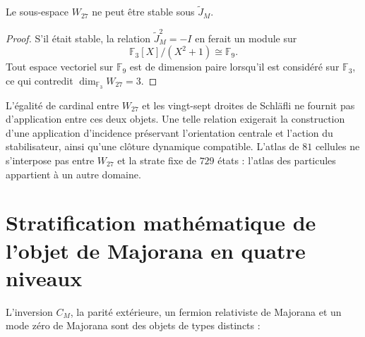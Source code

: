\begin{corollary}
\label{cor:obstruccion-cuadratica-w27} Le sous-espace \(W_{27}\) ne peut être stable sous \(\widetilde J_M\).
\end{corollary}

\begin{proof}
S’il était stable, la relation \(\widetilde J_M^2=-I\) en ferait un module sur
\[
 \mathbb F_3[X]/(X^2+1)\cong\mathbb F_9.
\]
Tout espace vectoriel sur \(\mathbb F_9\) est de dimension paire lorsqu’il est considéré sur \(\mathbb F_3\), ce qui contredit \(\dim_{\mathbb F_3}W_{27}=3\).
\end{proof}

L’égalité de cardinal entre \(W_{27}\) et les vingt-sept droites de Schläfli ne fournit pas d’application entre ces deux objets. Une telle relation exigerait la construction d’une application d’incidence préservant l’orientation centrale et l’action du stabilisateur, ainsi qu’une clôture dynamique compatible. L’atlas de \(81\) cellules ne s’interpose pas entre \(W_{27}\) et la strate fixe de \(729\) états : l’atlas des particules appartient à un autre domaine.

\section[Niveaux de Majorana]{Stratification mathématique de l’objet de Majorana en quatre niveaux}
\label{sec:cuatro-niveles-majorana}

L’inversion \(C_M\), la parité extérieure, un fermion relativiste de Majorana et un mode zéro de Majorana sont des objets de types distincts :

